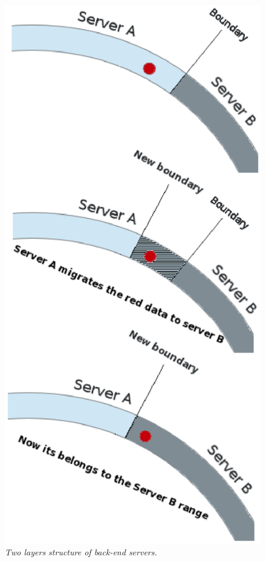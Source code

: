 


\begin{figure}
\centering \includegraphics[width=.20\textwidth]{graphic1.eps}
\caption{\textit{Two layers structure of back-end servers.}}
\label{fig:fig2}
\end{figure}






